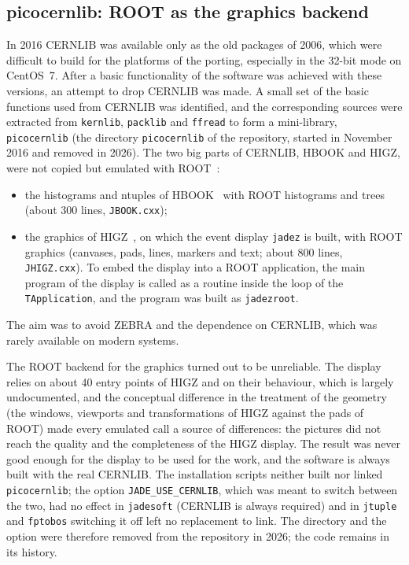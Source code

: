 \subsection{picocernlib: ROOT as the graphics backend}
\label{sec:picocernlib}
In 2016 CERNLIB was available only as the old packages of 2006, which were difficult to build for the platforms
of the porting, especially in the 32-bit mode on CentOS~7. After a basic functionality of the software was achieved with these versions, an attempt to
drop CERNLIB was made. A small set of the basic functions used from CERNLIB was identified, and the corresponding sources were
extracted from \texttt{kernlib}, \texttt{packlib} and \texttt{ffread} to form a mini-library, \texttt{picocernlib} (the directory
\texttt{picocernlib} of the repository, started in November 2016 and removed in 2026). The two big parts of CERNLIB, HBOOK and HIGZ, were not copied
but emulated with ROOT~\cite{Brun:1997pa,Antcheva:2009zz}:
\begin{itemize}
\item the histograms and ntuples of HBOOK~\cite{Brun:1995hbook} with ROOT histograms and trees (about 300 lines, \texttt{JBOOK.cxx});
\item the graphics of HIGZ~\cite{Couet:HIGZ}, on which the event display \texttt{jadez} is built, with ROOT graphics (canvases,
pads, lines, markers and text; about 800 lines, \texttt{JHIGZ.cxx}). To embed the display into a ROOT application, the main program of the
display is called as a routine inside the loop of the \texttt{TApplication}, and the program was built as \texttt{jadezroot}.
\end{itemize}
The aim was to avoid ZEBRA and the dependence on CERNLIB, which was rarely available on modern systems.

The ROOT backend for the graphics turned out to be unreliable. The display relies on about 40 entry points of HIGZ and on
their behaviour, which is largely undocumented, and the conceptual difference in the treatment of the geometry (the windows,
viewports and transformations of HIGZ against the pads of ROOT) made every emulated call a source of differences:
the pictures did not reach the quality and the completeness of the HIGZ display. The result was never good enough for the display to be used for the work, and the software is always built with the real CERNLIB. The installation scripts neither built nor linked \texttt{picocernlib};
the option \texttt{JADE\_\allowbreak{}USE\_\allowbreak{}CERNLIB}, which was meant to switch between the two, had no effect in \texttt{jadesoft} (CERNLIB is always
required) and in \texttt{jtuple} and \texttt{fptobos} switching it off left no replacement to link. The directory and the option
were therefore removed from the repository in 2026; the code remains in its history.

